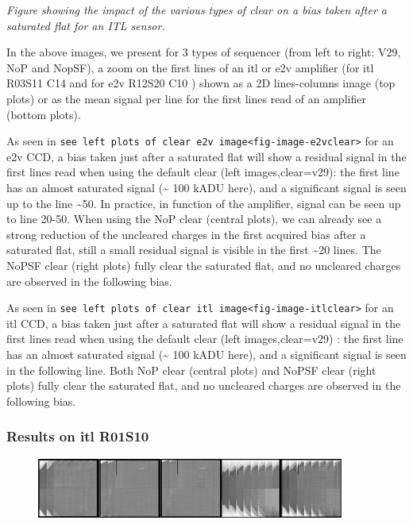 \emph{Figure showing the impact of the various types of clear on a bias
taken after a saturated flat for an ITL sensor.}

In the above images, we present for 3 types of sequencer (from left to
right: V29, NoP and NopSF), a zoom on the first lines of an itl or e2v
amplifier (for itl R03\label{s11}{S11} C14 and for e2v
R12\label{s20}{S20} C10 ) shown as a 2D lines-columns
image (top plots) or as the mean signal per line for the first lines
read of an amplifier (bottom plots).

As seen in
\texttt{see\ left\ plots\ of\ clear\ e2v\ image\textless{}fig-image-e2vclear\textgreater{}}
for an e2v CCD, a bias taken just after a saturated flat will show a
residual signal in the first lines read when using the default clear
(left images,clear=v29): the first line has an almost saturated signal
(\textasciitilde{} 100 kADU here), and a significant signal is seen up
to the line \textasciitilde50. In practice, in function of the
amplifier, signal can be seen up to line 20-50. When using the NoP clear
(central plots), we can already see a strong reduction of the uncleared
charges in the first acquired bias after a saturated flat, still a small
residual signal is visible in the first \textasciitilde20 lines. The
NoPSF clear (right plots) fully clear the saturated flat, and no
uncleared charges are observed in the following bias.

As seen in
\texttt{see\ left\ plots\ of\ clear\ itl\ image\textless{}fig-image-itlclear\textgreater{}}
for an itl CCD, a bias taken just after a saturated flat will show a
residual signal in the first lines read when using the default clear
(left images,clear=v29) : the first line has an almost saturated signal
(\textasciitilde{} 100 kADU here), and a significant signal is seen in
the following line. Both NoP clear (central plots) and NoPSF clear
(right plots) fully clear the saturated flat, and no uncleared charges
are observed in the following bias.

\subsubsection[Results on itl R01]{\texorpdfstring{Results on itl
R01\protect\hypertarget{s10}{}{S10}}{Results on itl R01S10}}\label{results-on-itl-r01s10}

\begin{figure}
\begin{centering}
\includegraphics[width=0.9\textwidth]{sections/figures/Clear_R01_S10.png}
\end{centering}
\end{figure}

